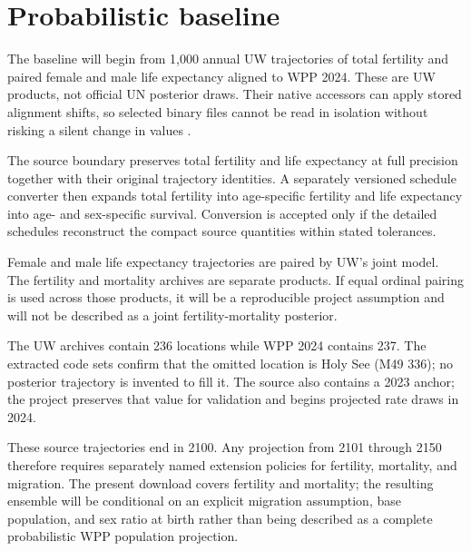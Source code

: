 \section{Probabilistic baseline}


The baseline will begin from 1,000 annual UW trajectories of total fertility
and paired female and male life expectancy aligned to WPP 2024. These are UW
products, not official UN posterior draws. Their native accessors can apply
stored alignment shifts, so selected binary files cannot be read in isolation
without risking a silent change in values \citep{uw2024downloads}.

The source boundary preserves total fertility and life expectancy at full
precision together with their original trajectory identities. A separately
versioned schedule converter then expands total fertility into age-specific
fertility and life expectancy into age- and sex-specific survival. Conversion
is accepted only if the detailed schedules reconstruct the compact source
quantities within stated tolerances.

Female and male life expectancy trajectories are paired by UW's joint model.
The fertility and mortality archives are separate products. If equal ordinal
pairing is used across those products, it will be a reproducible project
assumption and will not be described as a joint fertility-mortality posterior.

The UW archives contain 236 locations while WPP 2024 contains 237. The extracted
code sets confirm that the omitted location is Holy See (M49 336); no posterior
trajectory is invented to fill it. The source also contains a 2023 anchor; the
project preserves that value for validation and begins projected rate draws in
2024.

These source trajectories end in 2100. Any projection from 2101 through 2150
therefore requires separately named extension policies for fertility,
mortality, and migration. The present download covers fertility and mortality;
the resulting ensemble will be conditional on an explicit migration
assumption, base population, and sex ratio at birth rather than being described
as a complete probabilistic WPP population projection.
